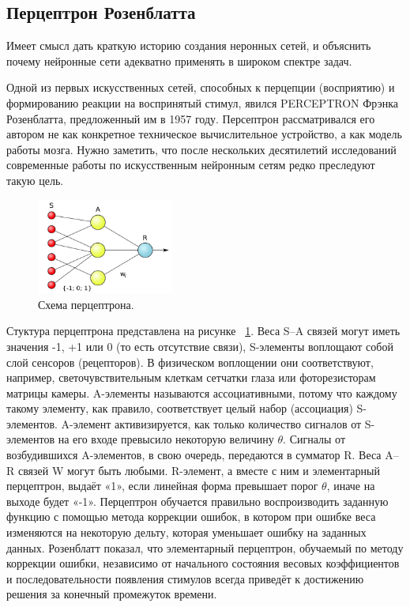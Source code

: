 \documentclass[12pt, oneside]{extbook}
\begin{document}
\begin{flushleft}
\section{Перцептрон Розенблатта}
\par
Имеет смысл дать краткую историю создания неронных сетей, и объяснить почему нейронные сети адекватно применять в широком спектре задач. 
\par
Одной из первых искусственных сетей, способных к перцепции (восприятию) и формированию реакции на воспринятый стимул, явился PERCEPTRON Фрэнка Розенблатта, предложенный им в 1957 году. Персептрон рассматривался его автором не как конкретное техническое вычислительное устройство, а как модель работы мозга. Нужно заметить, что после нескольких десятилетий исследований современные работы по искусственным нейронным сетям редко преследуют такую цель.\\
\begin{figure}[h]
\centering
\includegraphics[width=0.4\textwidth]{perceptron}
\caption{Схема перцептрона.}
\label{fig:perceptron}
\end{figure}
\par
Стуктура перцептрона представлена на рисунке ~\ref{fig:perceptron}. Веса S--A связей могут иметь значения -1, +1 или 0 (то есть отсутствие связи), S-элементы воплощают собой слой сенсоров (рецепторов). В физическом воплощении они соответствуют, например, светочувствительным клеткам сетчатки глаза или фоторезисторам матрицы камеры. A-элементы называются ассоциативными, потому что каждому такому элементу, как правило, соответствует целый набор (ассоциация) S-элементов. A-элемент активизируется, как только количество сигналов от S-элементов на его входе превысило некоторую величину $\theta$. Сигналы от возбудившихся A-элементов, в свою очередь, передаются в сумматор R. Веса A--R связей W могут быть любыми. R-элемент, а вместе с ним и элементарный перцептрон, выдаёт «1», если линейная форма превышает порог $\theta$, иначе на выходе будет «-1». Перцептрон обучается правильно воспроизводить заданную функцию с помощью метода коррекции ошибок, в котором при ошибке веса изменяются на некоторую дельту, которая уменьшает ошибку на заданных данных. Розенблатт показал, что элементарный перцептрон, обучаемый по методу коррекции ошибки, независимо от начального состояния весовых коэффициентов и последовательности появления стимулов всегда приведёт к достижению решения за конечный промежуток времени.

\end{flushleft}
\end{document}

